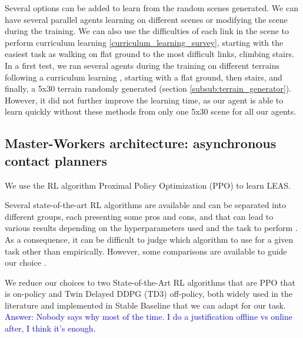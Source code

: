  Several options can be added to learn from the random scenes generated.
 We can have several parallel agents learning on different scenes or modifying the scene during the training.
 We can also use the difficulties of each link in the scene to perform curriculum learning \ref{curriculum_learning_survey}, starting with the easiest task as walking on flat ground to the most difficult links, climbing stairs.
 In a first test, we ran several agents during the training on different terrains following a curriculum learning \cite{curriculum_learning_survey}, starting with a flat ground, then stairs, and finally, a 5x30 terrain randomly generated (section \ref{subsub:terrain_generator}). However, it did not further improve the learning time, as our agent is able to learn quickly without these methods from only one 5x30 scene for all our agents.
 
 
\subsection{Master-Workers architecture: asynchronous contact planners\label{subsub:leas:master_worker}}
We use the RL algorithm Proximal Policy Optimization (PPO) to learn LEAS.

Several state-of-the-art RL algorithms are available and can be separated into different groups, each presenting some pros and cons, and that can lead to various results depending on the hyperparameters used and the task to perform \cite{RL_that_matters, RL_that_matters_OnPolicy}. As a consequence, it can be difficult to judge which algorithm to use for a given task other than empirically. However, some comparisons are available to guide our choice \cite{compare_PPO_TD3_SAC_DDPG}. 

We reduce our choices to two State-of-the-Art RL algorithms that are PPO \cite{PPO} that is on-policy and Twin Delayed DDPG (TD3) \cite{TD3} off-policy, both widely used in the literature and implemented in Stable Baseline \cite{stable-baselines} that we can adapt for our task.  
\textcolor{blue}{Answer: Nobody says why most of the time. I do a justification offline vs online after, I think it's enough.}

